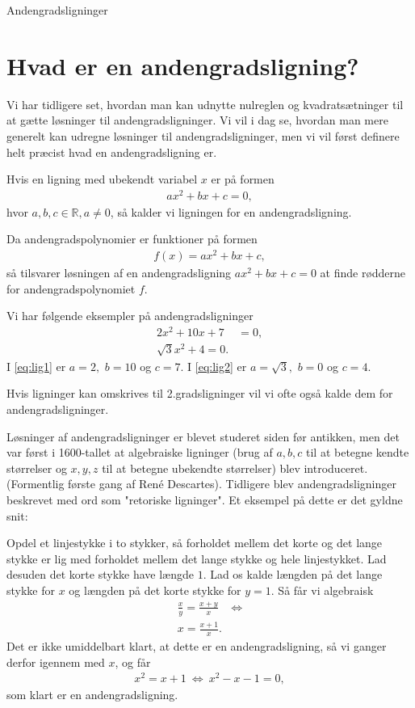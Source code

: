 \begin{center}
\Huge
Andengradsligninger
\end{center}

\section*{Hvad er en andengradsligning?}

Vi har tidligere set, hvordan man kan udnytte nulreglen og kvadratsætninger til at gætte løsninger til andengradsligninger. Vi vil i dag se, hvordan man mere generelt kan udregne løsninger til andengradsligninger, men vi vil først definere helt præcist hvad en andengradsligning er.
\begin{defn}[Andengradsligning]
Hvis en ligning med ubekendt variabel $x$ er på formen 
\begin{align*}
ax^2+bx+c=0,
\end{align*}
hvor $a,b,c\in \mathbb{R}, a\neq 0$, så kalder vi ligningen for en andengradsligning. 
\end{defn}
Da andengradspolynomier er funktioner på formen 
\begin{align*}
f(x) = ax^2+bx+c, 
\end{align*}
så tilsvarer løsningen af en andengradsligning $ax^2+bx+c= 0$ at finde rødderne for andengradspolynomiet $f$.  

\begin{exa}
Vi har følgende eksempler på andengradsligninger
\begin{align}
2x^2+10x+7&=0\label{eq:lig1},\\
\sqrt{3}x^2+4=0\label{eq:lig2}.
\end{align}
I \eqref{eq:lig1} er $a=2,$ $b=10$ og $c=7$. I \eqref{eq:lig2} er $a=\sqrt{3},$ $b=0$ og $c=4$. 
\end{exa}
Hvis ligninger kan omskrives til 2.gradsligninger vil vi ofte også kalde dem for andengradsligninger.
\begin{exa}
Løsninger af andengradsligninger er blevet studeret siden før antikken, men det var først i 1600-tallet at algebraiske ligninger (brug af $a,b,c$ til at betegne kendte størrelser og $x,y,z$ til at betegne ubekendte størrelser) blev introduceret. (Formentlig første gang af René Descartes). Tidligere blev andengradsligninger beskrevet med ord som "retoriske ligninger". Et eksempel på dette er det gyldne snit:

Opdel et linjestykke i to stykker, så forholdet mellem det korte og det lange stykke er lig med forholdet mellem det lange stykke og hele linjestykket. Lad desuden det korte stykke have længde $1$. Lad os kalde længden på det lange stykke for $x$ og længden på det korte stykke for $y=1$. Så får vi algebraisk
\begin{align*}
 \frac{x}{y} = \frac{x+y}{x} &\Leftrightarrow\\
 x = \frac{x+1}{x}.
\end{align*}
Det er ikke umiddelbart klart, at dette er en andengradsligning, så vi ganger derfor igennem med $x$, og får
\begin{align*}
x^2 = x+1\  \Leftrightarrow\ x^2-x-1=0,
\end{align*}
som klart er en andengradsligning.
\end{exa}
